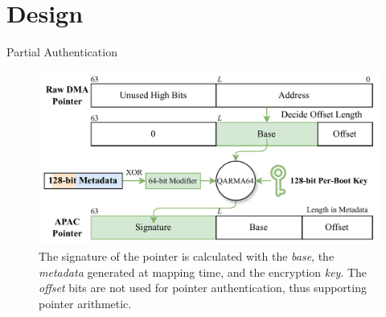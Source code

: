 \documentclass[10pt,aspectratio=169,mathserif]{beamer}
\newcommand{\name}{{\texorpdfstring{D{\smaller MA}A{\smaller UTH}}\xspace}\xspace}
\begin{document}
\section{Design}

\begin{frame}{Partial Authentication}
	\begin{figure}
		\centering
		\includegraphics[width=0.7\linewidth]{./images/apac.png}
		\caption{The signature of the pointer is calculated with the \textit{base}, the \textit{metadata} generated at mapping time, and the encryption \textit{key}. The \textit{offset} bits are not used for pointer authentication, thus supporting pointer arithmetic.}
	\end{figure}
\end{frame}
\end{document}
